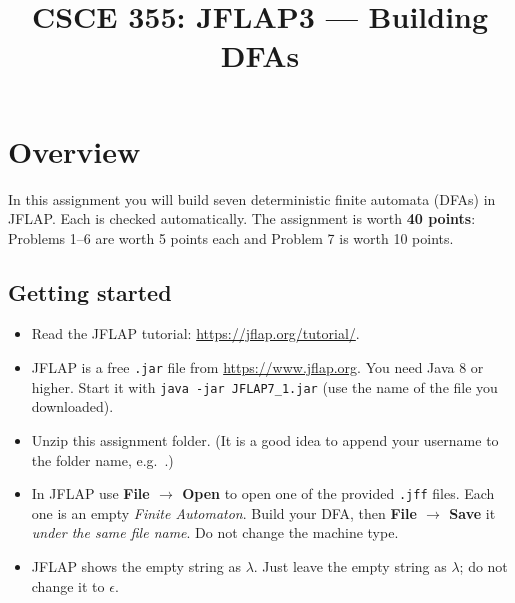 \documentclass[11pt]{article}
\title{CSCE 355: JFLAP3 --- Building DFAs}
\author{}
\date{}
\newcommand{\fn}[1]{\texttt{\detokenize{#1}}}
\begin{document}
\maketitle


\section*{Overview}

In this assignment you will build seven deterministic finite automata (DFAs) in
JFLAP. Each is checked automatically. The assignment is worth \textbf{40 points}:
Problems 1--6 are worth 5 points each and Problem 7 is worth 10 points.

\subsection*{Getting started}

\begin{itemize}
  \item Read the JFLAP tutorial: \url{https://jflap.org/tutorial/}.
  \item JFLAP is a free \texttt{.jar} file from \url{https://www.jflap.org}. You need
        Java 8 or higher. Start it with \texttt{java -jar JFLAP7\_1.jar} (use the name of
        the file you downloaded).
  \item Unzip this assignment folder. (It is a good idea to append your username to the
        folder name, e.g.\ \fn{JFLAP3_jsmith}.)
  \item In JFLAP use \textbf{File $\to$ Open} to open one of the provided \texttt{.jff}
        files. Each one is an empty \emph{Finite Automaton}. Build your DFA, then
        \textbf{File $\to$ Save} it \emph{under the same file name}. Do not change the
        machine type.
  \item JFLAP shows the empty string as $\lambda$. Just leave the empty string as
        $\lambda$; do not change it to $\epsilon$.
\end{itemize}
\end{document}
